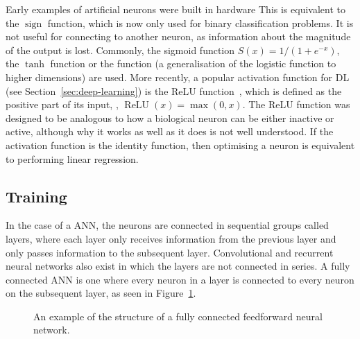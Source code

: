 
Early examples of artificial neurons were built in hardware 
This is equivalent to the \(\operatorname{sign}\) function, which is now only used for binary classification problems.
It is not useful for connecting to another neuron, as information about the magnitude of the output is lost.
Commonly, the sigmoid function \(S(x) = 1/(1 + e^{-x})\), the \(\tanh\) function or the  function (a generalisation of the logistic function to higher dimensions) are used.
More recently, a popular activation function for \ac{DL} (see Section~\ref{sec:deep-learning}) is the \ac{ReLU} function~\autocite{ramachandran2017}, which is defined as the positive part of its input, \ie{}, \(\operatorname{ReLU}(x) = \max(0, x)\).
The \ac{ReLU} function was designed to be analogous to how a biological neuron can be either inactive or active, although why it works as well as it does is not well understood.
If the activation function is the identity function, then optimising a neuron is equivalent to performing linear regression.

\subsection{Training} \label{sec:backpropagation}

In the case of a  \ac{ANN}, the neurons are connected in sequential groups called layers, where each layer only receives information from the previous layer and only passes information to the subsequent layer.
Convolutional and recurrent neural networks also exist in which the layers are not connected in series.
A fully connected \ac{ANN} is one where every neuron in a layer is connected to every neuron on the subsequent layer, as seen in Figure~\ref{fig:neural-network-example}.

\begin{figure}[htbp]
	\centering
	
	\caption{An example of the structure of a fully connected feedforward neural network.}
	\label{fig:neural-network-example}
\end{figure}

